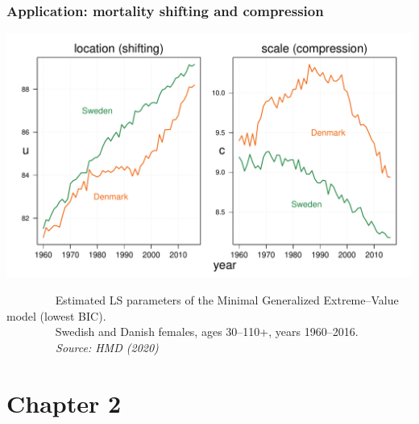 \documentclass[12pt, xcolor=table]{beamer}  %
\begin{document}
\begin{frame}\frametitle{Application: mortality shifting and compression}
\vspace{-0.25cm}
\begin{center}
\includegraphics[scale=0.45]{Figures/Ch1/F3_b}
\end{center}
\vspace{-0.3cm}
\tiny{$\quad\quad\quad\quad$ Estimated LS parameters of the Minimal Generalized Extreme--Value model (lowest BIC).\\ $\quad\quad\quad\quad$ Swedish and Danish females, ages 30--110+, years 1960--2016. \\ \emph{$\quad\quad\quad\quad$ Source: HMD (2020)}} %

\end{frame}

\section{Chapter 2}
\end{document}
